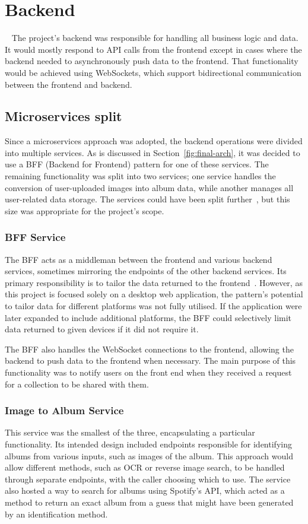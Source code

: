 \section{Backend}~\label{sec:backend-design}
The project's backend was responsible for handling all business logic and data. It would mostly respond to API calls from the frontend except in cases where the backend needed to asynchronously push data to the frontend. That functionality would be achieved using WebSockets, which support bidirectional communication between the frontend and backend.

\subsection{Microservices split}
Since a microservices approach was adopted, the backend operations were divided into multiple services. As is discussed in Section~\ref{fig:final-arch}, it was decided to use a BFF (Backend for Frontend) pattern for one of these services. The remaining functionality was split into two services; one service handles the conversion of user-uploaded images into album data, while another manages all user-related data storage. The services could have been split further~\cite{7030212}, but this size was appropriate for the project's scope.

\subsubsection{BFF Service}
The BFF acts as a middleman between the frontend and various backend services, sometimes mirroring the endpoints of the other backend services. Its primary responsibility is to tailor the data returned to the frontend~\cite{BFF}. However, as this project is focused solely on a desktop web application, the pattern's potential to tailor data for different platforms was not fully utilised. If the application were later expanded to include additional platforms, the BFF could selectively limit data returned to given devices if it did not require it.

The BFF also handles the WebSocket connections to the frontend, allowing the backend to push data to the frontend when necessary. The main purpose of this functionality was to notify users on the front end when they received a request for a collection to be shared with them.

\subsubsection{Image to Album Service}
This service was the smallest of the three, encapsulating a particular functionality. Its intended design included endpoints responsible for identifying albums from various inputs, such as images of the album. This approach would allow different methods, such as OCR or reverse image search, to be handled through separate endpoints, with the caller choosing which to use. The service also hosted a way to search for albums using Spotify's API, which acted as a method to return an exact album from a guess that might have been generated by an identification method.

